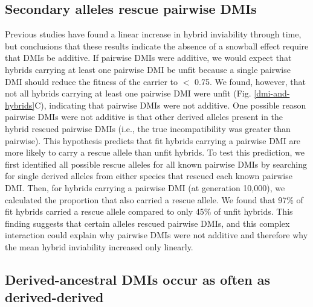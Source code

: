 \begin{doublespace}
\subsection{Secondary alleles rescue pairwise DMIs}

Previous studies have found a linear increase
in hybrid inviability through time,
but conclusions that these results indicate the absence
of a snowball effect require that DMIs be additive.
%
If pairwise DMIs were additive, we would expect that hybrids
carrying at least one pairwise DMI be unfit
because a single pairwise DMI should reduce
the fitness of the carrier to $<$ 0.75.
%
We found, however, that not all hybrids
carrying at least one pairwise DMI were unfit
(Fig. \ref{dmi-and-hybrids}C),
indicating that pairwise DMIs were not additive.
%
One possible reason pairwise DMIs were not additive
is that other derived alleles present in the hybrid rescued pairwise DMIs
(i.e., the true incompatibility was greater than pairwise).
%
This hypothesis predicts that fit hybrids carrying a pairwise DMI
are more likely to carry a rescue allele than unfit hybrids.
%
To test this prediction,
we first identified all possible rescue alleles for all known pairwise DMIs
by searching for single derived alleles from either species
that rescued each known pairwise DMI.
%
Then, for hybrids carrying a pairwise DMI (at generation 10,000),
we calculated the proportion that also carried a rescue allele.
%
We found that 97\% of fit hybrids carried a rescue allele
compared to only 45\% of unfit hybrids.
%
This finding suggests that certain alleles rescued pairwise DMIs,
and this complex interaction could explain
why pairwise DMIs were not additive and therefore
why the mean hybrid inviability increased only linearly.



\subsection{Derived-ancestral DMIs occur as often as derived-derived}


\end{doublespace}
